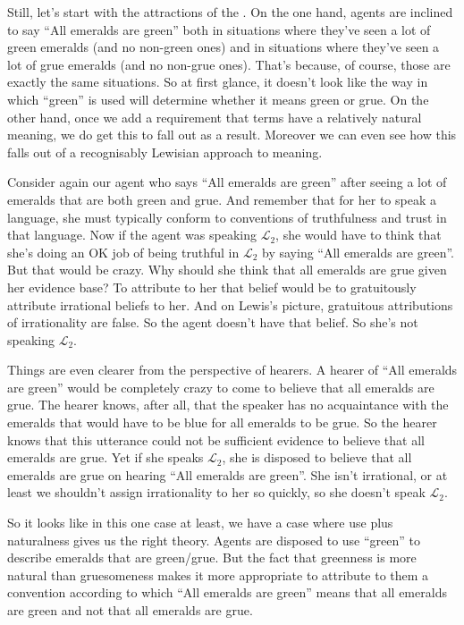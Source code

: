 Still, let's start with the attractions of the \UNT.  On the one hand, agents are inclined to say ``All emeralds are green'' both in situations where they've seen a lot of green emeralds (and no non-green ones) and in situations where they've seen a lot of grue emeralds (and no non-grue ones). That's because, of course, those are exactly the same situations. So at first glance, it doesn't look like the way in which ``green'' is used will determine whether it means green or grue. On the other hand, once we add a requirement that terms have a relatively natural meaning, we do get this to fall out as a result. Moreover we can even see how this falls out of a recognisably Lewisian approach to meaning.

Consider again our agent who says ``All emeralds are green'' after seeing a lot of emeralds that are both green and grue. And remember that for her to speak a language, she must typically conform to conventions of truthfulness and trust in that language. Now if the agent was speaking $\mathcal{L}_2$, she would have to think that she's doing an OK job of being truthful in $\mathcal{L}_2$ by saying ``All emeralds are green''. But that would be crazy. Why should she think that all emeralds are grue given her evidence base? To attribute to her that belief would be to gratuitously attribute irrational beliefs to her. And on Lewis's picture, gratuitous attributions of irrationality are false. So the agent doesn't have that belief. So she's not speaking $\mathcal{L}_2$.

Things are even clearer from the perspective of hearers. A hearer of ``All emeralds are green'' would be completely crazy to come to believe that all emeralds are grue. The hearer knows, after all, that the speaker has no acquaintance with the emeralds that would have to be blue for all emeralds to be grue. So the hearer knows that this utterance could not be sufficient evidence to believe that all emeralds are grue. Yet if she speaks $\mathcal{L}_2$, she is disposed to believe that all emeralds are grue on hearing ``All emeralds are green''. She isn't irrational, or at least we shouldn't assign irrationality to her so quickly, so she doesn't speak $\mathcal{L}_2$.

So it looks like in this one case at least, we have a case where use plus naturalness gives us the right theory. Agents are disposed to use ``green'' to describe emeralds that are green/grue. But the fact that greenness is more natural than gruesomeness makes it more appropriate to attribute to them a convention according to which ``All emeralds are green'' means that all emeralds are green and not that all emeralds are grue. 

